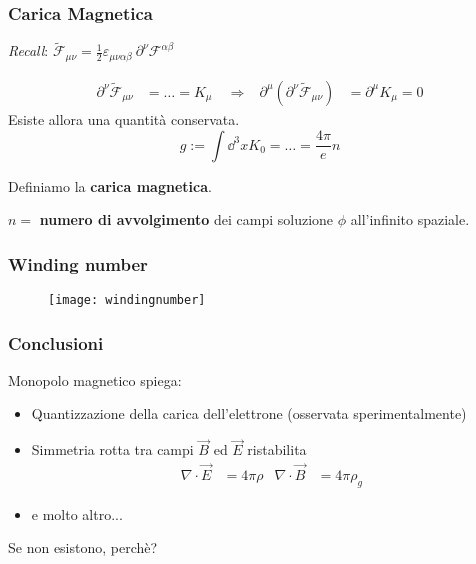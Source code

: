 \begin{frame}
\frametitle{Carica Magnetica}
\emph{Recall}: $\mathcal{\tilde{F}}_{\mu\nu} = \frac{1}{2} \varepsilon_{\mu\nu\alpha\beta}
\: \partial ^\nu \mathcal{F}^{\alpha\beta}$

\begin{equation*}
   \begin{aligned}
       \partial ^\nu \mathcal{\tilde{F}}_{\mu\nu} &= \dots  = K_\mu
          \quad \Rightarrow &
       \partial^\mu (\partial ^\nu \mathcal{\tilde{F}}_{\mu\nu})
         &= \partial ^\mu K_\mu  = 0
   \end{aligned}
\end{equation*}
Esiste allora una quantità conservata.\\
$$ \boxed{g := \int \dd ^3 x K_0 = \dots = \frac{4\pi}{e}n} $$
\begin{center}
Definiamo la \textbf{carica magnetica}.
\end{center}
$n = $ \textbf{numero di avvolgimento} dei campi
soluzione $\phi$ all'infinito spaziale.\\

\end{frame}
\begin{frame}
\frametitle{Winding number}
\vskip-5mm
\begin{figure}[h]
\texttt{[image: windingnumber]}
\end{figure}
\end{frame}

\begin{frame}
\frametitle{Conclusioni}
Monopolo magnetico spiega:
\begin{itemize}
   \item Quantizzazione della carica dell'elettrone (osservata sperimentalmente)
   \item Simmetria rotta tra campi $\vec B$ ed $\vec E$ ristabilita
      \begin{equation*} \begin{aligned}
      \nabla \cdot \vec E & = 4\pi\rho & \nabla \cdot \vec B & = 4\pi\rho_g
      \end{aligned}\end{equation*}
   \item e molto altro...
\end{itemize}

\begin{center}\Large
   Se non esistono, perchè?
\end{center}
\end{frame}


